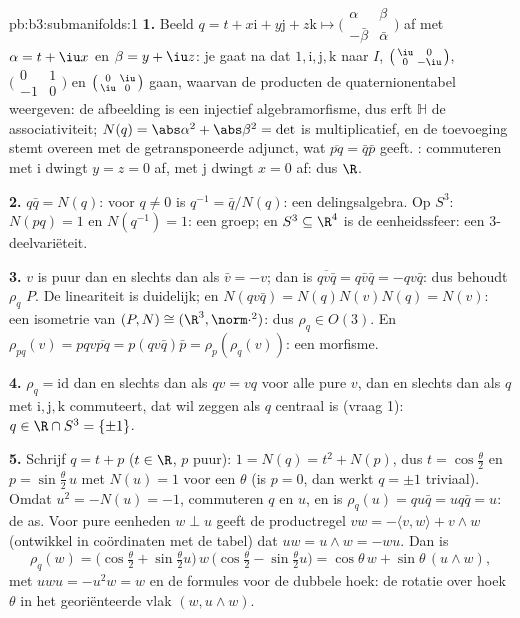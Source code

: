 \begin{solution}{pb:b3:submanifolds:1}
\textbf{1.} Beeld $q = t + x\mathrm i + y\mathrm j + z\mathrm k
\mapsto \bigl(\begin{smallmatrix}\alpha & \beta\\ -\bar\beta
& \bar\alpha\end{smallmatrix}\bigr)$ af met $\alpha = t + \iu x$
en $\beta = y + \iu z$: je gaat na dat $1, \mathrm i, \mathrm j,
\mathrm k$ naar $I$, $\bigl(\begin{smallmatrix}
\iu & 0\\ 0 & -\iu\end{smallmatrix}\bigr)$,
$\bigl(\begin{smallmatrix}0 & 1\\ -1 &
0\end{smallmatrix}\bigr)$ en $\bigl(\begin{smallmatrix}0 &
\iu\\ \iu & 0\end{smallmatrix}\bigr)$ gaan, waarvan de producten
de quaternionentabel weergeven: de afbeelding is een injectief
algebramorfisme, dus erft $\mathbb H$ de associativiteit; $N(q) =
\abs\alpha^2 + \abs\beta^2 = \det$ is multiplicatief, en de
toevoeging stemt overeen met de getransponeerde adjunct, wat
$\overline{pq} = \bar q\bar p$ geeft. : commuteren met
$\mathrm i$ dwingt $y = z = 0$ af, met $\mathrm j$ dwingt $x = 0$
af: dus $\R$.

\textbf{2.} $q\bar q = N(q)$: voor $q \neq 0$ is $q^{-1} = \bar
q/N(q)$: een delingsalgebra. Op $S^3$: $N(pq) = 1$ en
$N(q^{-1}) = 1$: een groep; en $S^3 \subseteq \R^4$ is de
eenheidssfeer: een  $3$-deelvariëteit.

\textbf{3.} $v$ is puur dan en slechts dan als $\bar v = -v$; dan
is $\overline{qv\bar q} = q\bar v\bar q = -qv\bar q$: dus behoudt
$\rho_q$ $P$. De lineariteit is duidelijk; en $N(qv\bar q) =
N(q)N(v)N(q) = N(v)$: een isometrie van $(P, N) \cong (\R^3,
\norm\cdot^2)$: dus $\rho_q \in O(3)$. En $\rho_{pq}(v) =
pqv\overline{pq} = p(qv\bar q)\bar p = \rho_p(\rho_q(v))$: een
morfisme.

\textbf{4.} $\rho_q = \mathrm{id}$ dan en slechts dan als $qv =
vq$ voor alle pure $v$, dan en slechts dan als $q$ met $\mathrm
i, \mathrm j, \mathrm k$ commuteert, dat wil zeggen als $q$
centraal is (vraag 1): $q \in \R\cap S^3 = \{\pm1\}$.

\textbf{5.} Schrijf $q = t + p$ ($t \in \R$, $p$ puur): $1 = N(q)
= t^2 + N(p)$, dus $t = \cos\frac\theta2$ en $p =
\sin\frac\theta2\,u$ met $N(u) = 1$ voor een $\theta$ (is $p =
0$, dan werkt $q = \pm1$ triviaal). Omdat $u^2 = -N(u) = -1$,
commuteren $q$ en $u$, en is $\rho_q(u) = qu\bar q = uq\bar q =
u$: de as. Voor pure eenheden $w \perp u$ geeft de productregel
$vw = -\langle v, w\rangle + v\wedge w$ (ontwikkel in coördinaten
met de tabel) dat $uw = u\wedge w = -wu$. Dan is
\[
\rho_q(w) = \bigl(\cos\tfrac\theta2 +
\sin\tfrac\theta2u\bigr)\,w\,\bigl(\cos\tfrac\theta2 -
\sin\tfrac\theta2u\bigr)
= \cos\theta\,w + \sin\theta\,(u\wedge w),
\]
met $uwu = -u^2w = w$ en de formules voor de dubbele hoek: de
rotatie over hoek $\theta$ in het georiënteerde vlak $(w, u\wedge
w)$.


\end{solution}
